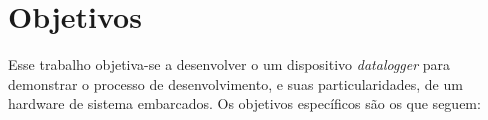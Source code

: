 










\section{Objetivos}

Esse trabalho objetiva-se a desenvolver o um dispositivo \textit{datalogger} para demonstrar o processo de desenvolvimento, e suas particularidades, de um hardware de sistema embarcados. Os objetivos específicos são os que seguem:


